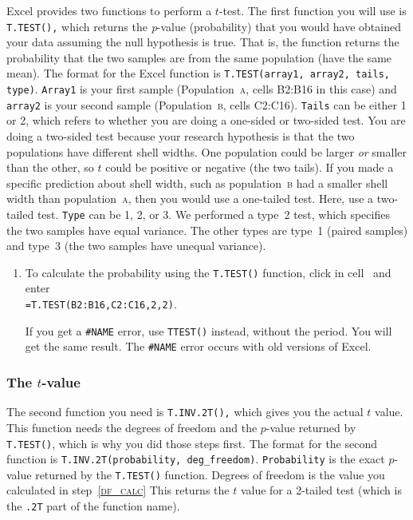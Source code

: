 \documentclass[12pt]{exam}
\newcommand*\Popa{Population~\textsc{a}}
\newcommand*\Popb{Population~\textsc{b}}
\newcommand*\popa{population~\textsc{a}} %
\newcommand*\popb{population~\textsc{b}} %
\newcommand*\xcell[1]{cell~\liningnum{#1}}
\begin{document}
Excel provides two functions to perform a $t$-test. The first function you will use is \texttt{T.TEST(),} which returns the \emph{p}-value (probability) that you would have obtained your data assuming the null hypothesis is true. That is, the function returns the probability that the two samples are from the same population (have the same mean).  The format for the Excel function is \texttt{T.TEST(array1, array2, tails, type)}. \texttt{Array1} is your first sample (\Popa, cells {\liningnum B2:B16} in this case) and \texttt{array2} is your second sample (\Popb, cells {\liningnum C2:C16}). \texttt{Tails} can be either 1 or 2, which refers to whether you are doing a one-sided or two-sided test. You are doing a two-sided test because your research hypothesis is that the two populations have different shell widths. One population could be larger \emph{or} smaller than the other, so $t$ could be positive or negative (the two tails). If you made a specific prediction about shell width, such as \popb{} had a smaller shell width than \popa, then you would use a one-tailed test. Here, use a two-tailed test.  \texttt{Type} can be 1, 2, or 3. We performed a type~2 test, which specifies the two samples have equal variance. The other types are type~1 (paired samples) and type~3 (the two samples have unequal variance).

\begin{enumerate}[resume]
	\item To calculate the probability using the \texttt{T.TEST()} function, click in \xcell{B21} and enter\\ \texttt{=T.TEST(B2:B16,C2:C16,2,2)}. 
	
	If you get a \texttt{\#NAME} error, use \texttt{TTEST()} instead, without the period. You will get the same result. The \texttt{\#NAME} error occurs with old versions of Excel.  

\end{enumerate}

\subsubsection*{The $t$-value}

The second function you need is \texttt{T.INV.2T(),} which gives you the actual $t$ value. This function needs the degrees of freedom and the $p$-value returned by \texttt{T.TEST()}, which is why you did those steps first. The format for the second function is \texttt{T.INV.2T(probability, deg\_freedom)}. \texttt{Probability} is the exact $p$-value returned by the \texttt{T.TEST()} function. Degrees of freedom is the value you calculated in step~\textsc{\ref{df_calc}} This returns the $t$ value for a 2-tailed test (which is the \texttt{.2T} part of the function name).
\end{document}
